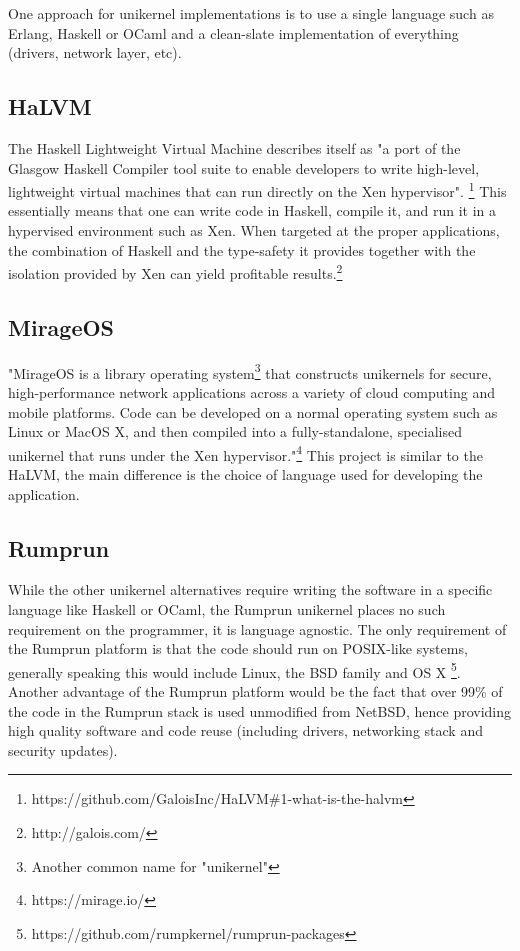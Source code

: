 \documentclass[10pt,a4paper,twoside]{article}
\begin{document}
One approach for unikernel implementations is to use a single language such as Erlang, Haskell or OCaml
and a clean-slate implementation of everything (drivers, network layer, etc).\cite{RumpComparison}

\subsection{HaLVM}

The Haskell Lightweight Virtual Machine describes itself as
"a port of the Glasgow Haskell Compiler tool suite to enable developers to write high-level,
lightweight virtual machines that can run directly on the Xen hypervisor".
\footnote{https://github.com/GaloisInc/HaLVM\#1-what-is-the-halvm}
This essentially means that one can write code in Haskell, compile it, and run it in a hypervised environment
such as Xen. When targeted at the proper applications, the combination of Haskell and the type-safety it provides
together with the isolation provided by Xen can yield profitable results.\footnote{http://galois.com/}

\subsection{MirageOS}
"MirageOS is a library operating system\footnote{Another common name for "unikernel"} that constructs unikernels
for secure, high-performance network applications across a variety of cloud computing and mobile platforms.
Code can be developed on a normal operating system such as Linux or MacOS X, and then compiled into a
fully-standalone, specialised unikernel that runs under the Xen hypervisor."\footnote{https://mirage.io/}
 This project is similar to the HaLVM, the main difference is the choice of language used for developing
 the application.

\subsection{Rumprun}
While the other unikernel alternatives require writing the software in a specific language like Haskell or
OCaml, the Rumprun unikernel places no such requirement on the programmer, it is language agnostic.
 The only requirement of the Rumprun platform is that the code should run on POSIX-like systems,
 generally speaking this would include Linux, the BSD family and OS X
 \footnote{https://github.com/rumpkernel/rumprun-packages}. Another advantage of the
 Rumprun platform would be the fact that over 99\% of the code in the Rumprun stack is
 used unmodified from NetBSD, hence providing high quality software and code reuse
 (including drivers, networking stack and security updates).\cite{RumpComparison}
\end{document}
